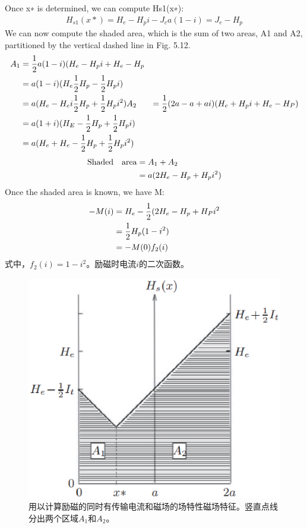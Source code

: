 Once x∗ is determined, we can compute Hs1(x∗):
\begin{align*}%
H_{s1}(x*)=H_{e}-H_{p}i-J_{c}a(1-i)=J_{e}-H_{p}
\end{align*}
We can now compute the shaded area, which is the sum of two areas, A1 and A2,
partitioned by the vertical dashed line in Fig. 5.12.
\begin{align*}%
A_{1}&=\frac{1}{2}a(1-i)(H_{e}-H_{p}i+H_{e}-H_{p}\\
&=a(1-i)(H_{e}\frac{1}{2}H_{p}-\frac{1}{2}H_{p}i)\\
&=a(H_{e}-H_{e}i\frac{1}{2}H_{p}+\frac{1}{2}H_{p}i^{2})
A_{2}&=\frac{1}{2}(2a-a+ai)(H_{e}+H_{p}i+H_{e}-H_{P})\\\notag
&=a(1+i)(H_E-\frac{1}{2}H_{p}+\frac{1}{2}H_{p}i)\\\notag
&=a(H_{e}+H_{e}-\frac{1}{2}H_{p}+\frac{1}{2}H_{p}i^{2})
\end{align*}
\begin{align*}%
\text{Shaded\quad area}&=A_{1}+A_{2}\\
&=a(2H_{e}-H_{p}+H_{p}i^{2})
\end{align*}
Once the shaded area is known, we have M:
\begin{subequations}
	\begin{align*}
-M(i)&=H_{e}-\frac{1}{2}(2H_{e}-H_{p}+H_{P}i^{2}\\\notag
&=\frac{1}{2}H_{p}(1-i^{2})\\
&=-M(0)f_{2}(i)
	\end{align*}
\end{subequations}
式中，$f_2(i) = 1 − i^2$。励磁时电流$i$的二次函数。

\begin{figure}[htbp]
	\centering
	\includegraphics[scale=0.6]{chpt5/figs/fig5.12.eps}
	\caption{用以计算励磁的同时有传输电流和磁场的场特性磁场特征。竖直点线分出两个区域$A_1$和$A_2$。}
\end{figure}


